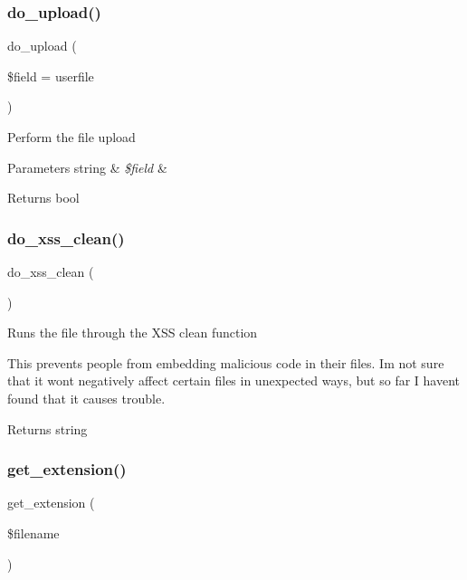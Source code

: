 \subsubsection{\texorpdfstring{do\+\_\+upload()}{do\_upload()}}
{\footnotesize\ttfamily do\+\_\+upload (\begin{DoxyParamCaption}\item[{}]{\$field = {\ttfamily \textquotesingle{}userfile\textquotesingle{}} }\end{DoxyParamCaption})}

Perform the file upload


\begin{DoxyParams}[1]{Parameters}
string & {\em \$field} & \\
\hline
\end{DoxyParams}
\begin{DoxyReturn}{Returns}
bool 
\end{DoxyReturn}
\mbox{\label{class_c_i___upload_ae7e5f9b6d774795da126647f10c3c2a6}} 
\subsubsection{\texorpdfstring{do\+\_\+xss\+\_\+clean()}{do\_xss\_clean()}}
{\footnotesize\ttfamily do\+\_\+xss\+\_\+clean (\begin{DoxyParamCaption}{ }\end{DoxyParamCaption})}

Runs the file through the X\+SS clean function

This prevents people from embedding malicious code in their files. I\textquotesingle{}m not sure that it won\textquotesingle{}t negatively affect certain files in unexpected ways, but so far I haven\textquotesingle{}t found that it causes trouble.

\begin{DoxyReturn}{Returns}
string 
\end{DoxyReturn}
\mbox{\label{class_c_i___upload_a6c656eedccb1131accc8e350bc50632f}} 
\subsubsection{\texorpdfstring{get\+\_\+extension()}{get\_extension()}}
{\footnotesize\ttfamily get\+\_\+extension (\begin{DoxyParamCaption}\item[{}]{\$filename }\end{DoxyParamCaption})}

